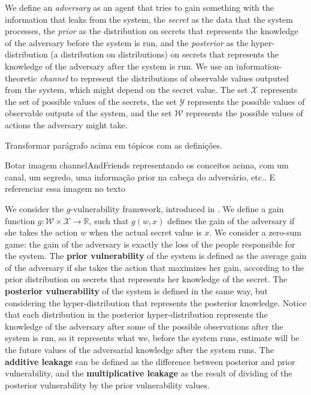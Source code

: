 We define an \emph{adversary} as an agent that tries to gain something with the information that leaks from the system, the \emph{secret} as the data that the system processes, the \emph{prior} as the distribution on secrets that represents the knowledge of the adversary before the system is run, and the \emph{posterior} as the hyper-distribution (a distribution on distributions) on secrets that represents the knowledge of the adversary after the system is run. We use an information-theoretic \emph{channel} to represent the distributions of observable values outputed from the system, which might depend on the secret value. The set $\mathcal{X}$ represents the set of possible values of the secrets, the set $\mathcal{Y}$ represents the possible values of observable outputs of the system, and the set $\mathcal{W}$ represents the possible values of actions the adversary might take.

{\color{red} Transformar parágrafo acima em tópicos com as definições.}

{\color{red} Botar imagem channelAndFriends representando os conceitos acima, com um canal, um segredo, uma informação prior na cabeça do adversário, etc.. E referenciar essa imagem no texto}

We consider the $g$-vulnerability framweork, introduced in \cite{QIF}. We define a gain function $g : \mathcal{W} \times \mathcal{X} \rightarrow \mathbb{R}$, such that $g(w,x)$ defines the gain of the adversary if she takes the action $w$ when the actual secret value is $x$. We consider a zero-sum game: the gain of the adversary is exactly the loss of the people responsible for the system. The \textbf{prior vulnerability} of the system is defined as the average gain of the adversary if she takes the action that maximizes her gain, according to the prior distribution on secrets that represents her knowledge of the secret. The \textbf{posterior vulnerability} of the system is defined in the same way, but considering the hyper-distribution that represents the posterior knowledge. Notice that each distribution in the posterior hyper-distribution represents the knowledge of the adversary after some of the possible observations after the system is run, so it represents what we, before the system runs, estimate will be the future values of the adversarial knowledge after the system runs. The \textbf{additive leakage} can be defined as the difference between posterior and prior vulnerability, and the \textbf{multiplicative leakage} as the result of dividing of the posterior vulnerability by the prior vulnerability values.

